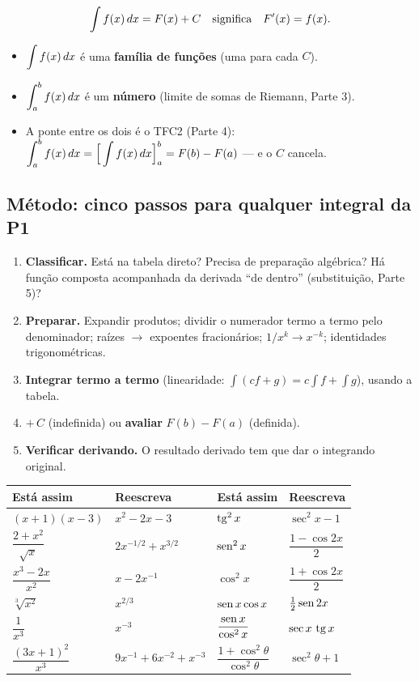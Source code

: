 \[
\int f(x)\,dx = F(x)+C \quad\text{significa}\quad F'(x)=f(x).
\]
\begin{itemize}[leftmargin=1.4em, itemsep=2pt]
\item $\displaystyle\int f(x)\,dx$ é uma \textbf{família de funções} (uma para cada $C$).
\item $\displaystyle\int_a^b f(x)\,dx$ é um \textbf{número} (limite de somas de Riemann, Parte 3).
\item A ponte entre os dois é o TFC2 (Parte 4): $\displaystyle\int_a^b f(x)\,dx = \Big[\int f(x)\,dx\Big]_a^b = F(b)-F(a)$ --- e o $C$ cancela.
\end{itemize}

\subsection{Método: cinco passos para qualquer integral da P1}

\begin{metodo}[{Procedimento}]
\begin{enumerate}[leftmargin=1.6em, itemsep=2pt]
\item \textbf{Classificar.} Está na tabela direto? Precisa de preparação algébrica? Há função composta acompanhada da derivada ``de dentro'' (substituição, Parte 5)?
\item \textbf{Preparar.} Expandir produtos; dividir o numerador termo a termo pelo denominador; raízes $\to$ expoentes fracionários; $1/x^k\to x^{-k}$; identidades trigonométricas.
\item \textbf{Integrar termo a termo} (linearidade: $\int (cf+g) = c\int f + \int g$), usando a tabela.
\item \textbf{$+\,C$} (indefinida) ou \textbf{avaliar} $F(b)-F(a)$ (definida).
\item \textbf{Verificar derivando.} O resultado derivado tem que dar o integrando original.
\end{enumerate}
\end{metodo}

\begin{definicao}
\small
\begin{tabular}{@{}ll@{\qquad}ll@{}}
\toprule
\textbf{Está assim} & \textbf{Reescreva} & \textbf{Está assim} & \textbf{Reescreva}\\
\midrule
$(x+1)(x-3)$ & $x^2-2x-3$ & $\operatorname{tg}^2 x$ & $\sec^2 x - 1$\\[2pt]
$\dfrac{2+x^2}{\sqrt{x}}$ & $2x^{-1/2}+x^{3/2}$ & $\operatorname{sen}^2 x$ & $\dfrac{1-\cos 2x}{2}$\\[6pt]
$\dfrac{x^3-2x}{x^2}$ & $x-2x^{-1}$ & $\cos^2 x$ & $\dfrac{1+\cos 2x}{2}$\\[6pt]
$\sqrt[3]{x^2}$ & $x^{2/3}$ & $\operatorname{sen} x\cos x$ & $\tfrac12\operatorname{sen} 2x$\\[2pt]
$\dfrac{1}{x^3}$ & $x^{-3}$ & $\dfrac{\operatorname{sen} x}{\cos^2 x}$ & $\sec x\,\operatorname{tg} x$\\[6pt]
$\dfrac{(3x+1)^2}{x^3}$ & $9x^{-1}+6x^{-2}+x^{-3}$ & $\dfrac{1+\cos^2\theta}{\cos^2\theta}$ & $\sec^2\theta+1$\\
\bottomrule
\end{tabular}
\end{definicao}

